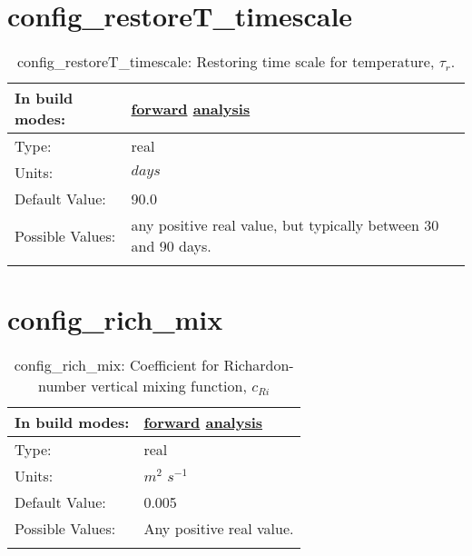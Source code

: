 \section[config\_restoreT\_timescale]{config\_restoreT\_timescale}
\label{sec:nm_sec_config_restoreT_timescale}
\begin{center}
\begin{longtable}{| p{2.0in} || p{4.0in} |}
    \hline
    In build modes: & \hyperref[subsec:forward_nm_tab_forcing]{forward} \hyperref[subsec:analysis_nm_tab_forcing]{analysis} \\
    \hline
    Type: & real \\
    \hline
    Units: & $days$ \\
    \hline
    Default Value: & 90.0 \\
    \hline
    Possible Values: & any positive real value, but typically between 30 and 90 days. \\
    \hline
    \caption{config\_restoreT\_timescale:  Restoring time scale for temperature,  $\tau_r.$ }
\end{longtable}
\end{center}
\section[config\_rich\_mix]{config\_rich\_mix}
\label{sec:nm_sec_config_rich_mix}
\begin{center}
\begin{longtable}{| p{2.0in} || p{4.0in} |}
    \hline
    In build modes: & \hyperref[subsec:forward_nm_tab_vmix_rich]{forward} \hyperref[subsec:analysis_nm_tab_vmix_rich]{analysis} \\
    \hline
    Type: & real \\
    \hline
    Units: & $m^2$ $s^{-1}$ \\
    \hline
    Default Value: & 0.005 \\
    \hline
    Possible Values: & Any positive real value. \\
    \hline
    \caption{config\_rich\_mix:  Coefficient for Richardon-number vertical mixing function,  $c_{Ri}$ }
\end{longtable}
\end{center}
